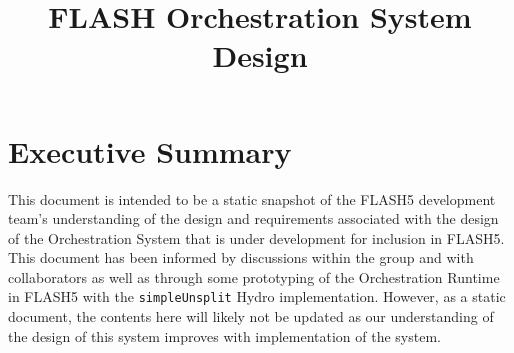 \documentclass{article}
\title{FLASH Orchestration System Design}
\begin{document}
\theoremstyle{definition} %
\newtheorem{req}{Req}[section]
\newtheorem{spec}{Spec}[section]

\maketitle

\section{Executive Summary}
This document is intended to be a static snapshot of the FLASH5 development
team's understanding of the design and requirements associated with the design
of the Orchestration System that is under development for inclusion in FLASH5.
This document has been informed by discussions within the group and with
collaborators as well as through some prototyping of the Orchestration Runtime
in FLASH5 with the \texttt{simpleUnsplit} Hydro implementation.  However, as a static
document, the contents here will likely not be updated as our understanding of
the design of this system improves with implementation of the system.\\
\end{document}

